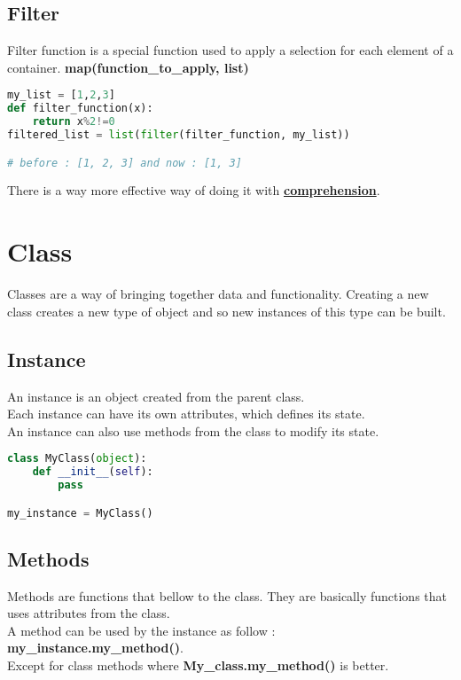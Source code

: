 \documentclass[a4paper, 12pt, titlepage]{scrartcl} %
\begin{document}
\subsection{Filter}
Filter function is a special function used to apply a selection for each element of a container. \textbf{map(function\_to\_apply, list)}
\begin{lstlisting}[language=Python]
my_list = [1,2,3]
def filter_function(x):
	return x%2!=0
filtered_list = list(filter(filter_function, my_list))

# before : [1, 2, 3] and now : [1, 3]
\end{lstlisting} \vspace{5mm}
There is a way more effective way of doing it with \hyperref[Comprehension]{\textbf{comprehension}}.

\newpage
\section{Class}
\label{sec:Class}
Classes are a way of bringing together data and functionality. Creating a new class creates a new type of object and so new instances of this type can be built.

\subsection{Instance}
An instance is an object created from the parent class. \\
Each instance can have its own attributes, which defines its state. \\
An instance can also use methods from the class to modify its state.
\begin{lstlisting}[language=Python]
class MyClass(object):
	def __init__(self):
		pass

my_instance = MyClass()
\end{lstlisting} \vspace{5mm}

\subsection{Methods}
Methods are functions that bellow to the class. They are basically functions that uses attributes from the class. \\
A method can be used by the instance as follow : \textbf{my\_instance.my\_method()}. \\
Except for class methods where \textbf{My\_class.my\_method()} is better.
\end{document}

